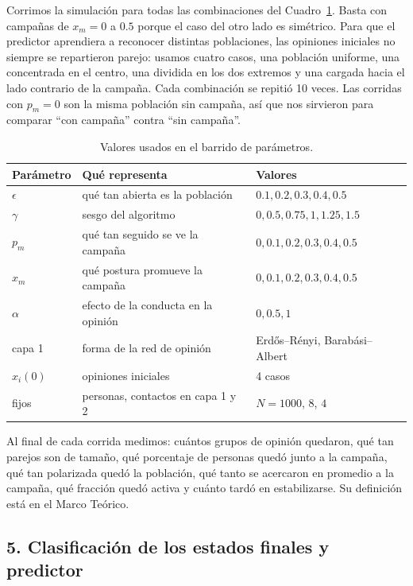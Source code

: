 \documentclass[11pt]{article}
\begin{document}
Corrimos la simulación para todas las combinaciones del Cuadro~\ref{tab:barrido}. Basta con
campañas de $x_m=0$ a $0.5$ porque el caso del otro lado es simétrico. Para que el predictor
aprendiera a reconocer distintas poblaciones, las opiniones iniciales no siempre se repartieron
parejo: usamos cuatro casos, una población uniforme, una concentrada en el centro, una dividida en
los dos extremos y una cargada hacia el lado contrario de la campaña. Cada combinación se repitió
10 veces. Las corridas con $p_m=0$ son la misma población sin campaña, así que nos sirvieron para
comparar ``con campaña'' contra ``sin campaña''.

\begin{table}[h]
	\centering
	\small
	\begin{tabular}{lll}
		\hline
		Parámetro & Qué representa & Valores \\
		\hline
		$\epsilon$ & qué tan abierta es la población & $0.1, 0.2, 0.3, 0.4, 0.5$ \\
		$\gamma$ & sesgo del algoritmo & $0, 0.5, 0.75, 1, 1.25, 1.5$ \\
		$p_m$ & qué tan seguido se ve la campaña & $0, 0.1, 0.2, 0.3, 0.4, 0.5$ \\
		$x_m$ & qué postura promueve la campaña & $0, 0.1, 0.2, 0.3, 0.4, 0.5$ \\
		$\alpha$ & efecto de la conducta en la opinión & $0, 0.5, 1$ \\
		capa 1 & forma de la red de opinión & Erd\H{o}s--Rényi, Barabási--Albert \\
		$x_i(0)$ & opiniones iniciales & 4 casos \\
		\hline
		fijos & personas, contactos en capa 1 y 2 & $N=1000$, $8$, $4$ \\
		\hline
	\end{tabular}
	\caption{Valores usados en el barrido de parámetros.}
	\label{tab:barrido}
\end{table}

Al final de cada corrida medimos: cuántos grupos de opinión quedaron, qué tan parejos son de tamaño,
qué porcentaje de personas quedó junto a la campaña, qué tan polarizada quedó la población, qué
tanto se acercaron en promedio a la campaña, qué fracción quedó activa y cuánto tardó en
estabilizarse. Su definición está en el Marco Teórico.

\subsection*{5. Clasificación de los estados finales y predictor}
\end{document}
